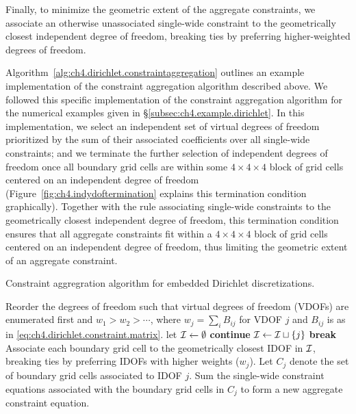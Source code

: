 Finally, to minimize the geometric extent of the aggregate constraints, we associate an otherwise unassociated single-wide constraint to the geometrically closest independent degree of freedom, breaking ties by preferring higher-weighted degrees of freedom.

Algorithm~\ref{alg:ch4.dirichlet.constraintaggregation} outlines an example implementation of the constraint aggregation algorithm described above. We followed this specific implementation of the constraint aggregation algorithm for the numerical examples given in \S\ref{subsec:ch4.example.dirichlet}. In this implementation, we select an independent set of virtual degrees of freedom prioritized by the sum of their associated coefficients over all single-wide constraints; and we terminate the further selection of independent degrees of freedom once all boundary grid cells are within some $4 \times 4 \times 4$ block of grid cells centered on an independent degree of freedom (Figure~\ref{fig:ch4.indydoftermination} explains this termination condition graphically). Together with the rule associating single-wide constraints to the geometrically closest independent degree of freedom, this termination condition ensures that all aggregate constraints fit within a $4 \times 4 \times 4$ block of grid cells centered on an independent degree of freedom, thus limiting the geometric extent of an aggregate constraint.

\begin{algorithm}
\caption{Constraint aggregration algorithm for embedded Dirichlet discretizations.}
\label{alg:ch4.dirichlet.constraintaggregation}
\begin{algorithmic}
\STATE Reorder the degrees of freedom such that virtual degrees of freedom (VDOFs) are enumerated first and $w_1 > w_2 > \dotsm$, where $w_j = \sum_i B_{ij}$ for VDOF $j$ and $B_{ij}$ is as in \eqref{eq:ch4.dirichlet.constraint.matrix}.
\STATE let $\mathcal{I} \leftarrow \emptyset$ 
\STATE {}
    \STATE {}
        \STATE \textbf{continue}
    \ENDIF
    \STATE $\mathcal{I} \leftarrow \mathcal{I} \sqcup \left\lbrace j \right\rbrace$ 
    \STATE {}
        \STATE \textbf{break}
    \ENDIF
\ENDFOR
\STATE Associate each boundary grid cell to the geometrically closest IDOF in $\mathcal{I}$, breaking ties by preferring IDOFs with higher weights ($w_j$). Let $C_j$ denote the set of boundary grid cells associated to IDOF $j$.
    \STATE Sum the single-wide constraint equations associated with the boundary grid cells in $C_j$ to form a new aggregate constraint equation.
\ENDFOR
\end{algorithmic}
\end{algorithm}

